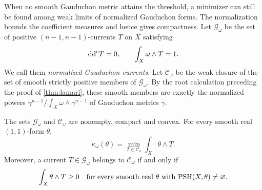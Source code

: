 When no smooth Gauduchon metric attains the threshold, a minimizer can still be found among weak limits of normalized Gauduchon forms. The normalization bounds the coefficient measures and hence gives compactness. Let $\mathscr G_\omega$ be the set of positive $(n-1,n-1)$-currents $T$ on $X$ satisfying
\[
 \mathrm{dd}^{\mathrm{c}} T=0,\qquad\int_X\omega\wedge T=1.
\]
We call them \emph{normalized Gauduchon currents}. Let $\mathscr C_\omega$ be the weak closure of the set of smooth strictly positive members of $\mathscr G_\omega$. By the root calculation preceding the proof of \cref{thm:lamari}, these smooth members are exactly the normalized powers $\gamma^{n-1}/\int_X\omega\wedge\gamma^{n-1}$ of Gauduchon metrics $\gamma$.

\begin{proposition}\label{prop:gauduchon-linear-compact-dual}
The sets $\mathscr G_\omega$ and $\mathscr C_\omega$ are nonempty, compact and convex. For every smooth real $(1,1)$-form $\theta$,
\begin{equation}\label{eq:gauduchon-linear-minimum}
 \kappa_\omega(\theta)
   =\min_{T\in\mathscr C_\omega}\int_X\theta\wedge T.
\end{equation}
Moreover, a current $T\in\mathscr G_\omega$ belongs to $\mathscr C_\omega$ if and only if
\begin{equation}\label{eq:gauduchon-linear-polar}
 \int_X\theta\wedge T\geq0
 \quad\text{for every smooth real }\theta
       \text{ with }\mathrm{PSH}(X,\theta)\ne\varnothing.
\end{equation}
\end{proposition}
